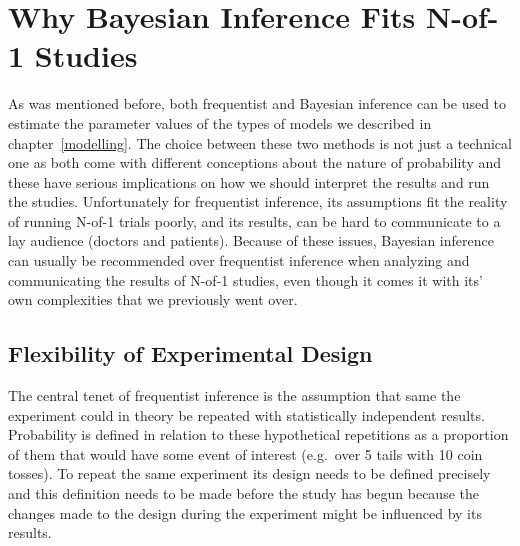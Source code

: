 \documentclass[12pt,a4paper,leqno]{report}
\theoremstyle{plain}
\theoremstyle{definition}
\theoremstyle{remark}
\begin{document}


\section{Why Bayesian Inference Fits N-of-1 Studies}\label{whybayes}

As was mentioned before, both frequentist and Bayesian inference can be used to
estimate the parameter values of the types of models we described
in chapter\ \ref{modelling}. The choice between these two methods is not just a
technical one as both come with different conceptions about the nature of probability
and these have serious implications on how we should interpret the results and run the studies.
Unfortunately for frequentist inference, its assumptions fit the reality of running
N-of-1 trials poorly, and its results, can be hard to communicate to a lay
audience (doctors and patients). Because of these issues, Bayesian inference
can usually be recommended over frequentist inference when analyzing and
communicating the results of N-of-1 studies, even though it comes it with its'
own complexities that we previously went over.

\subsection{Flexibility of Experimental Design}\label{whybayes}

The central tenet of frequentist inference is the assumption that same the
experiment could in theory be repeated with statistically independent results. Probability
is defined in relation to these hypothetical repetitions as a proportion of them
that would have some event of interest (e.g.\ over 5 tails with 10 coin tosses).
To repeat the same experiment its design needs to be defined precisely and this
definition needs to be made before the study has begun because the changes made
to the design during the experiment might be influenced by its results.
\end{document}
